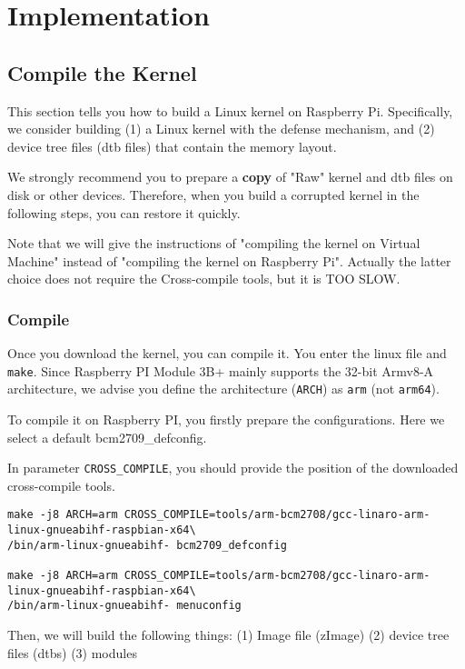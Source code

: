 \section{Implementation}
\label{sec:impl}


\subsection{Compile the Kernel}
This section tells you how to build a Linux kernel on Raspberry Pi. Specifically, we consider building (1) a Linux kernel with the defense mechanism, and (2) device tree files (dtb files) that contain the memory layout.

We strongly recommend you to prepare a \textbf{copy} of "Raw" kernel and dtb files on disk or other devices. Therefore, when you build a corrupted kernel in the following steps, you can restore it quickly.

Note that we will give the instructions of "compiling the kernel on Virtual Machine" instead of "compiling the kernel on Raspberry Pi". Actually the latter choice does not require the Cross-compile tools, but it is TOO SLOW.

\subsubsection{Compile}

Once you download the kernel, you can compile it. 
You enter the linux file and \texttt{make}. Since Raspberry PI Module 3B+ mainly supports the 32-bit Armv8-A architecture, we advise you define the architecture (\texttt{ARCH}) as \texttt{arm} (not \texttt{arm64}).

To compile it on Raspberry PI, you firstly prepare the configurations. Here we select a default bcm2709\_defconfig. 

In parameter \texttt{CROSS\_COMPILE}, you should provide the position of the downloaded cross-compile tools.


\begin{lstlisting}
make -j8 ARCH=arm CROSS_COMPILE=tools/arm-bcm2708/gcc-linaro-arm-linux-gnueabihf-raspbian-x64\
/bin/arm-linux-gnueabihf- bcm2709_defconfig

make -j8 ARCH=arm CROSS_COMPILE=tools/arm-bcm2708/gcc-linaro-arm-linux-gnueabihf-raspbian-x64\
/bin/arm-linux-gnueabihf- menuconfig
\end{lstlisting}



Then, we will build the following things: (1) Image file (zImage) (2) device tree files (dtbs) (3) modules

